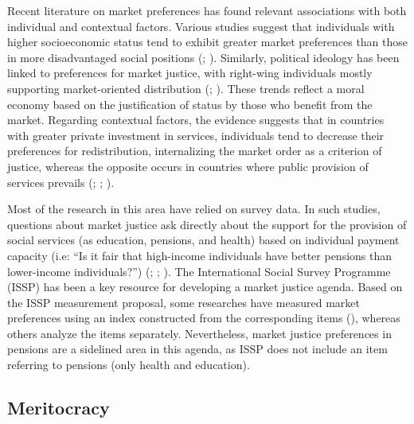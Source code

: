 \documentclass[
  12pt,
]{article}
\begin{document}
Recent literature on market preferences has found relevant associations
with both individual and contextual factors. Various studies suggest
that individuals with higher socioeconomic status tend to exhibit
greater market preferences than those in more disadvantaged social
positions (;
). Similarly, political
ideology has been linked to preferences for market justice, with
right-wing individuals mostly supporting market-oriented distribution
(;
). These trends
reflect a moral economy based on the justification of status by those
who benefit from the market. Regarding contextual factors, the evidence
suggests that in countries with greater private investment in services,
individuals tend to decrease their preferences for redistribution,
internalizing the market order as a criterion of justice, whereas the
opposite occurs in countries where public provision of services prevails
(;
;
).

Most of the research in this area have relied on survey data. In such
studies, questions about market justice ask directly about the support
for the provision of social services (as education, pensions, and
health) based on individual payment capacity (i.e: ``Is it fair that
high-income individuals have better pensions than lower-income
individuals?'') (; ;
). The International Social
Survey Programme (ISSP) has been a key resource for developing a market
justice agenda. Based on the ISSP measurement proposal, some researches
have measured market preferences using an index constructed from the
corresponding items (), whereas others analyze the items separately.
Nevertheless, market justice preferences in pensions are a sidelined
area in this agenda, as ISSP does not include an item referring to
pensions (only health and education).

\subsection{Meritocracy}\label{meritocracy}
\end{document}
